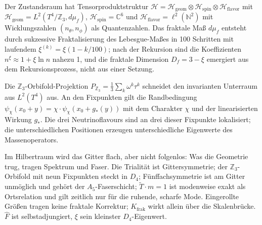 Der Zustandsraum hat Tensorproduktstruktur
$\mathcal{H} = \mathcal{H}_{\mathrm{geom}}\otimes\mathcal{H}_{\mathrm{spin}}
\otimes\mathcal{H}_{\mathrm{flavor}}$ mit
$\mathcal{H}_{\mathrm{geom}} = L^2(T^4/\mathbb{Z}_3,d\mu_f)$,
$\mathcal{H}_{\mathrm{spin}} = \mathbb{C}^6$ und
$\mathcal{H}_{\mathrm{flavor}} = \ell^2(\mathbb{N}^2)$ mit Wicklungszahlen
$(n_\theta,n_\phi)$ als Quantenzahlen. Das fraktale Maß $d\mu_f$ entsteht
durch sukzessive Fraktalisierung des Lebesgue-Maßes in 100 Schritten
mit laufendem $\xi^{(k)} = \xi(1-k/100)$; nach der Rekursion sind die
Koeffizienten $n^\xi\approx1+\xi\ln n$ nahezu 1, und die fraktale
Dimension $D_f = 3-\xi$ emergiert aus dem Rekursionsprozess, nicht aus
einer Setzung.

Die $\mathbb{Z}_3$-Orbifold-Projektion $P_{\mathbb{Z}_3} = \frac13\sum_k
\omega^k\tau^k$ schneidet den invarianten Unterraum aus $L^2(T^4)$ aus.
An den Fixpunkten gilt die Randbedingung
$\psi_\chi(x_0+y) = \chi\cdot\psi_\chi(x_0+g_*(y))$ mit dem Charakter
$\chi$ und der linearisierten Wirkung $g_*$. Die drei Neutrinoflavours
sind an drei dieser Fixpunkte lokalisiert; die unterschiedlichen
Positionen erzeugen unterschiedliche Eigenwerte des
Massenoperators.

\begin{keypoint}
Im Hilbertraum wird das Gitter flach, aber nicht folgenlos: Was die
Geometrie trug, tragen Spektrum und Faser. Die Trialität ist
Gittersymmetrie; der $\mathbb{Z}_3$-Orbifold mit neun Fixpunkten steckt
in $D_4$; Fünffachsymmetrie ist am Gitter unmöglich und gehört der
$A_5$-Faserschicht; $\tilde T\cdot m = 1$ ist modenweise exakt als
Ortsrelation und gilt zeitlich nur für die ruhende, scharfe Mode.
Eingerollte Größen tragen keine fraktale Korrektur; $K_{\mathrm{frak}}$
wirkt allein über die Skalenbrücke. $\hat F$ ist selbstadjungiert, $\xi$
sein kleinster $D_4$-Eigenwert.
\end{keypoint}

